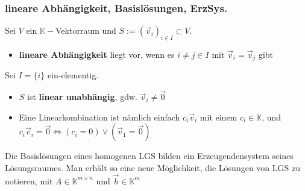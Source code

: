 \documentclass[titlepage]{article}
\newcommand{\K}{\mathbb{K}}
\newcommand{\1}{\mathbb{1}}
\newcommand{\0}{\mathbb{0}}
\begin{document}
				\subsubsection{lineare Abhängigkeit, Basislösungen, ErzSys.}
					Sei $V$ ein $\K-$Vektorraum und $S:=(\vec{v}_i)_{i\in I}\subset V$.
					\begin{itemize}
						\item \textbf{lineare Abhängigkeit} liegt vor, wenn es $i\neq j\in I$ mit $\vec{v}_i=\vec{v}_j$ gibt
					\end{itemize}
					Sei $I=\{i\}$ ein-elementig.
					\begin{itemize}
						\item $S$ ist \textbf{linear unabhängig}, gdw. $\vec{v}_i\neq\vec{0}$
						\item Eine Linearkombination ist nämlich einfach $c_i\vec{v}_i$ mit einem $c_i\in\K$, und $c_i\vec{v}_i=\vec{0}\Longleftrightarrow(c_i=0)\vee(\vec{v}_1=\vec{0})$
					\end{itemize}
					Die Basislösungen eines homogenen LGS bilden ein Erzeugendensystem seines Lösungsraumes. Man erhält so eine neue Möglichkeit, die Lösungen von LGS zu notieren, mit $A\in\K^{m\times n}$ und $\vec{b}\in\K^m$
\end{document}
